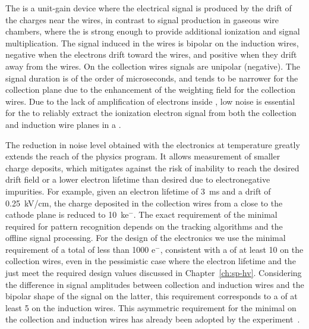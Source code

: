 The    is a unit-gain device where the 
electrical signal is produced by the drift of the charges near the wires, 
in contrast to signal production in gaseous wire 
chambers, where the \efield is strong enough to provide additional
ionization and signal multiplication. The signal induced in the 
 wires is bipolar on the induction wires, negative when the
electrons drift toward the wires, and positive when they drift away from
the wires. On the collection wires signals are unipolar (negative).
The signal duration is of the order of microseconds, and tends to be narrower
for the collection plane due to the enhancement of the weighting field for
the collection wires. Due to the lack of amplification of electrons inside 
, low noise is essential for the  to reliably extract the 
ionization electron signal from both the collection and induction wire planes 
in a  . 

The reduction in noise level obtained with the  electronics at 
 temperature greatly extends the reach of the  
physics program. It allows measurement of smaller charge deposits, which 
mitigates against the risk of inability to reach the desired drift field 
or a lower electron lifetime than desired due to electronegative impurities.
For example, given an electron lifetime of \SI{3}{ms} and a drift \efield
of \SI{0.25}{kV/cm}, the charge deposited in the collection wires from a 
 close to the cathode plane is reduced to \SI{10}{k}{e$^-$}.
The exact requirement of the minimal  required for pattern
recognition depends on the tracking algorithms and the offline signal 
processing. For the design of the  electronics we use the
minimal requirement of a total  of less than 1000 e$^-$, consistent 
with a  of at least 10 on the collection wires, even in the
pessimistic case where the electron lifetime and the \efield just meet 
the required design values discussed in Chapter~\ref{ch:sp-hv}. Considering
the difference in signal amplitudes between collection and induction wires
and the bipolar shape of the signal on the latter, this requirement corresponds 
to a  of at least 5 on the induction wires. This asymmetric requirement 
for the minimal  on the collection and induction wires has already been 
adopted by the  experiment~\cite{bib:sbnddoc1921}.

